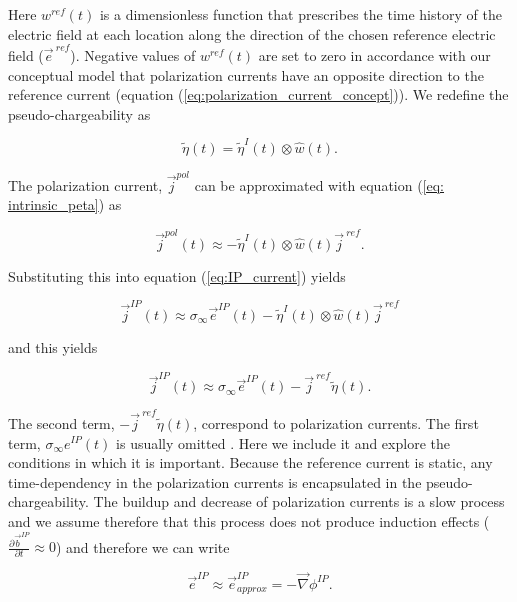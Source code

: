 \documentclass[extra,mreferee]{gji}
\newcommand{\grad}{\vec \nabla}
\newcommand{\siginf}{\sigma_\infty}
\renewcommand {\j}  { {\vec j} }
\renewcommand {\b}  { {\vec b} }
\newcommand {\e}  { {\vec e} }
\newcommand{\peta}{\tilde{\eta}}
\newcommand{\eref}{\e^{\ ref}}
\newcommand{\jref}{\j^{\ ref}}
\begin{document}
Here $w^{ref}(t)$ is a dimensionless function that prescribes the time history of the electric field at each location along the direction of the chosen reference electric field ($\eref$).  Negative values of  $w^{ref}(t)$ are set to zero in accordance with our conceptual model that polarization currents have an opposite direction to the reference current (equation (\ref{eq:polarization_current_concept})).
We redefine the pseudo-chargeability as
\begin{linenomath*}
\begin{equation}
    \peta(t) = \peta^{I}(t)\otimes \hat{w}(t).
    \label{eq: pseudochargeability}
\end{equation}
\end{linenomath*}
The polarization current, $\j^{pol}$ can be approximated with equation (\ref{eq: intrinsic_peta}) as
\begin{linenomath*}
\begin{equation}
  \j^{pol}(t) \approx - \peta^{I}(t)\otimes \hat{w}(t)\jref.
\end{equation}
\end{linenomath*}
Substituting this into equation (\ref{eq:IP_current}) yields
\begin{linenomath*}
\begin{equation}
  \j^{IP}(t) \approx \siginf\e^{IP}(t) - \peta^{I}(t)\otimes \hat{w}(t)\jref
\end{equation}
\end{linenomath*}
and this yields
\begin{linenomath*}
\begin{equation}
  \j^{IP}(t) \approx \siginf\e^{IP}(t) -\jref\peta(t).
  \label{eq: jip_EMIP}
\end{equation}
\end{linenomath*}

The second term, $-\jref\peta(t)$, correspond to polarization currents. The first term, $\siginf e^{IP}(t)$ is usually omitted \cite[]{Smith1988a}. Here we include it and explore the conditions in which it is important. 
Because the reference current is static, any time-dependency in the polarization currents is encapsulated in the pseudo-chargeability. The buildup and decrease of polarization currents is a slow process and we assume therefore that this process does not produce induction effects ($\frac{\partial \b^{IP}}{\partial t} \approx 0$) and therefore we can write 
\begin{linenomath*}
\begin{equation}
  \e^{IP} \approx  \e^{IP}_{approx} = -\grad\phi^{IP}.
  \label{eq: eip_approx}
\end{equation}
\end{linenomath*}
\end{document}
